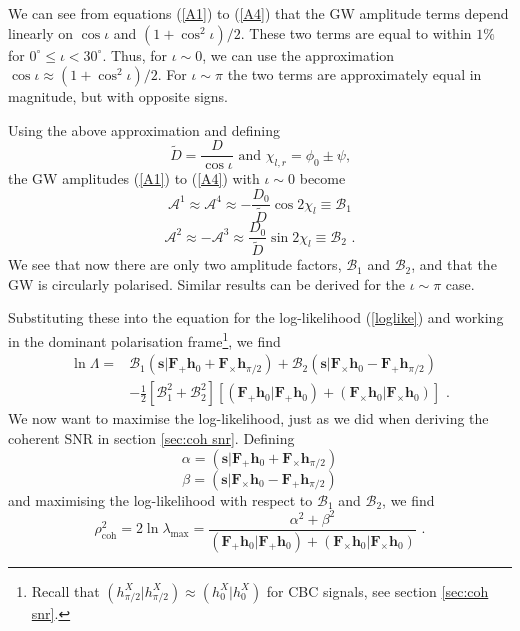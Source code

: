 \documentclass[11pt]{cuthesis}
\newcommand{\fs}{\text{ .}}
\begin{document}
We can see from equations (\ref{A1}) to (\ref{A4}) that the GW amplitude terms depend linearly on $\cos\iota$ and $(1+\cos^2\iota)/2$. These two terms are equal to within $1\%$ for $0^\circ\leq\iota<30^\circ$. Thus, for $\iota \sim 0$, we can use the approximation $\cos\iota \approx (1+\cos^2\iota)/2$. For $\iota \sim \pi$ the two terms are approximately equal in magnitude, but with opposite signs. 

Using the above approximation and defining 
\begin{equation}
\tilde{D} = \frac{D}{\cos\iota} \text{   and   } \chi_{l,r} = \phi_0 \pm \psi \text{,} 
\end{equation}
the GW amplitudes  (\ref{A1}) to (\ref{A4}) with $\iota\sim 0$ become
\begin{equation}
\mathcal{A}^1 \approx \mathcal{A}^4 \approx -\frac{D_0}{\tilde{D}} \cos 2\chi_l \equiv \mathcal{B}_1
\end{equation}
\begin{equation}
\mathcal{A}^2 \approx -\mathcal{A}^3 \approx \frac{D_0}{\tilde{D}} \sin 2\chi_l \equiv \mathcal{B}_2 \fs
\end{equation}
We see that now there are only two amplitude factors, $\mathcal{B}_1$ and $\mathcal{B}_2$, and that the GW is circularly polarised. Similar results can be derived for the $\iota \sim \pi$ case. 

Substituting these into the equation for the log-likelihood (\ref{loglike}) and working in the dominant polarisation frame\footnote{Recall that $(h_{\pi/2}^X|h_{\pi/2}^X)\approx (h_0^X|h_0^X)$ for CBC signals, see section \ref{sec:coh snr}.}, we find
\begin{align} 
\ln \Lambda = & \mathcal{B}_1 (\textbf{s}|\textbf{F}_+\textbf{h}_0 + \textbf{F}_\times \textbf{h}_{\pi /2} ) + \mathcal{B}_2  (\textbf{s}|\textbf{F}_\times\textbf{h}_0 - \textbf{F}_+ \textbf{h}_{\pi /2} ) \\ & - \frac{1}{2} [\mathcal{B}_1^2 + \mathcal{B}_2^2 ] [ (\textbf{F}_+\textbf{h}_0|\textbf{F}_+\textbf{h}_0) + (\textbf{F}_\times \textbf{h}_0|\textbf{F}_\times \textbf{h}_0) ] \fs
\end{align}
We now want to maximise the log-likelihood, just as we did when deriving the coherent SNR in section \ref{sec:coh snr}.  Defining 
\begin{equation}
\alpha = (\textbf{s}|\textbf{F}_+\textbf{h}_0 + \textbf{F}_\times \textbf{h}_{\pi /2} )
\end{equation}
\begin{equation}
\beta =  (\textbf{s}|\textbf{F}_\times\textbf{h}_0 - \textbf{F}_+ \textbf{h}_{\pi /2} ) 
\end{equation}
and maximising the log-likelihood with respect to $\mathcal{B}_1$ and $\mathcal{B}_2$, we find 
\begin{equation}
\rho_\text{coh}^2 = 2\ln \lambda_\text{max} = \frac{\alpha^2 + \beta^2}{ (\textbf{F}_+\textbf{h}_0|\textbf{F}_+\textbf{h}_0) + (\textbf{F}_\times \textbf{h}_0|\textbf{F}_\times \textbf{h}_0)} \fs
\end{equation}
\end{document}
